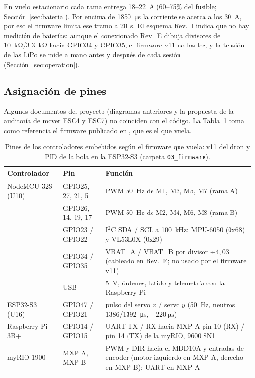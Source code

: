En vuelo estacionario cada rama entrega 18--\SI{22}{\ampere} (60--75\% del fusible; Sección~\ref{sec:bateria}). Por encima de \SI{1850}{\micro\second} la corriente se acerca a los \SI{30}{\ampere}, por eso el firmware limita ese tramo a \SI{20}{\second}. El esquema Rev.~I indica que no hay medición de baterías: aunque el conexionado Rev.~E dibuja divisores de \SI{10}{\kilo\ohm}/\SI{3.3}{\kilo\ohm} hacia GPIO34 y GPIO35, el firmware v11 no los lee, y la tensión de las LiPo se mide a mano antes y después de cada sesión (Sección~\ref{sec:operation}).

\subsection{Asignación de pines}
\label{sec:pins}
Algunos documentos del proyecto (diagramas anteriores y la propuesta de la auditoría de mover ESC4 y ESC7) no coinciden con el código. La Tabla~\ref{tab:pins} toma como referencia el firmware publicado en , que es el que vuela.

\begin{table}[!htbp]
\centering
\caption{Pines de los controladores embebidos según el firmware que vuela: v11 del dron y PID de la bola en la ESP32-S3 (carpeta \texttt{03\_firmware}).}
\label{tab:pins}
\small
\begin{tabularx}{\textwidth}{@{}llX@{}}
\toprule
Controlador & Pin & Función \\
\midrule
NodeMCU-32S (U10) & GPIO25, 27, 21, 5 & PWM \SI{50}{\hertz} de M1, M3, M5, M7 (rama A) \\
 & GPIO26, 14, 19, 17 & PWM \SI{50}{\hertz} de M2, M4, M6, M8 (rama B) \\
 & GPIO23 / GPIO22 & I$^2$C SDA / SCL a \SI{100}{\kilo\hertz}: MPU-6050 (0x68) y VL53L0X (0x29) \\
 & GPIO34 / GPIO35 & VBAT\_A / VBAT\_B por divisor $\div4{,}03$ (cableado en Rev.~E; no usado por el firmware v11) \\
 & USB & \SI{5}{\volt}, órdenes, latido y telemetría con la Raspberry Pi \\
ESP32-S3 (U16) & GPIO47 / GPIO21 & pulso del servo $x$ / servo $y$ (\SI{50}{\hertz}, neutros 1386/\SI{1392}{\micro\second}, $\pm\SI{220}{\micro\second}$) \\
Raspberry Pi 3B+ & GPIO14 / GPIO15 & UART TX / RX hacia MXP-A pin 10 (RX) / pin 14 (TX) de la myRIO, 9600 8N1 \\
myRIO-1900 & MXP-A, MXP-B & PWM y DIR hacia el MDD10A y entradas de encoder (motor izquierdo en MXP-A, derecho en MXP-B); UART en MXP-A \\
\bottomrule
\end{tabularx}
\end{table}

